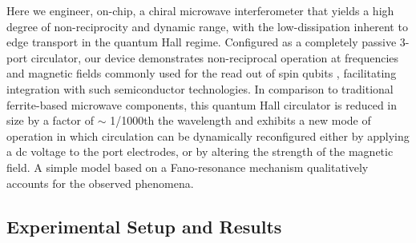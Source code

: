 Here we engineer, on-chip, a chiral microwave interferometer that yields a high degree of non-reciprocity and dynamic range, with the low-dissipation inherent to edge transport in the quantum Hall regime. Configured as a completely passive 3-port circulator, our device demonstrates non-reciprocal operation at frequencies and magnetic fields commonly used for the read out of spin qubits \cite{Reilly:2007ig,barthel2009rapid, PhysRevLett.110.046805, nature11449}, facilitating integration with such semiconductor technologies. In comparison to traditional ferrite-based microwave components, this quantum Hall circulator is reduced in size by a factor of $\sim$ 1/1000th the wavelength and exhibits a new mode of operation in which circulation can be dynamically reconfigured either by applying a dc voltage to the port electrodes, or by altering the strength of the magnetic field. A simple model based on a Fano-resonance mechanism \cite{miroshnichenko2010fano} qualitatively accounts for the observed phenomena.

\subsection{Experimental Setup and Results}
